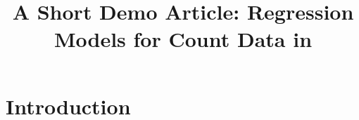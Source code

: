 \documentclass[article]{jss}
\author{}
\title{A Short Demo Article: Regression Models for Count Data in \proglang{R}}
\begin{document}
\section{Introduction}

% 

\newpage

\begin{appendix}

\end{appendix}
\end{document}
